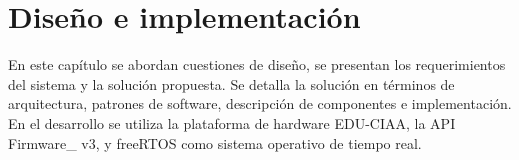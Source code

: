 \chapter{Diseño e implementación} %
\label{Chapter3} %

En este capítulo se abordan cuestiones de diseño, se presentan los requerimientos del sistema y la solución propuesta. Se detalla la solución en términos de arquitectura, patrones de software, descripción de componentes e implementación. En el desarrollo se utiliza la plataforma de hardware EDU-CIAA\citep{CIAA}, la API Firmware\_ v3\citep{firmwarev3}, y freeRTOS\citep{freeRTOS} como sistema operativo de tiempo real.\\




